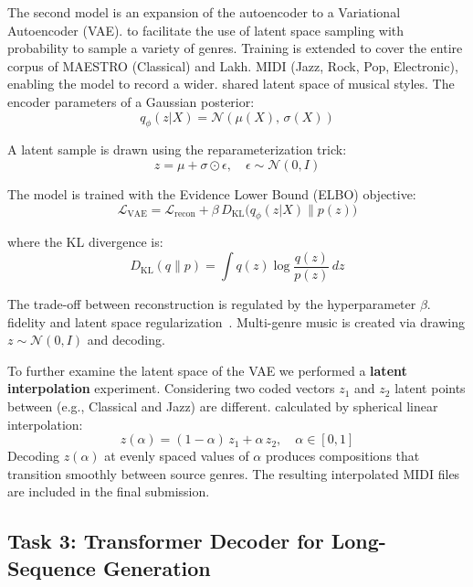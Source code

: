 \documentclass[conference]{IEEEtran}
\begin{document}
The second model is an expansion of the autoencoder to a Variational Autoencoder (VAE).
to facilitate the use of latent space sampling with probability to sample a variety of genres. Training
is extended to cover the entire corpus of MAESTRO (Classical) and Lakh.
MIDI (Jazz, Rock, Pop, Electronic), enabling the model to record a wider.
shared latent space of musical styles. The encoder
parameters of a Gaussian posterior:
\begin{equation}
q_\phi(z|X) = \mathcal{N}(\mu(X),\, \sigma(X))
\end{equation}

A latent sample is drawn using the reparameterization trick:
\begin{equation}
z = \mu + \sigma \odot \epsilon, \quad \epsilon \sim \mathcal{N}(0, I)
\end{equation}

The model is trained with the Evidence Lower Bound (ELBO) objective:
\begin{equation}
\mathcal{L}_{\text{VAE}} = \mathcal{L}_{\text{recon}} + \beta \, D_{\text{KL}}\bigl(q_\phi(z|X) \| p(z)\bigr)
\end{equation}

where the KL divergence is:
\begin{equation}
D_{\text{KL}}(q \| p) = \int q(z) \log \frac{q(z)}{p(z)}\, dz
\end{equation}


The trade-off between reconstruction is regulated by the hyperparameter $\beta$.
fidelity and latent space regularization~\cite{higgins2016beta}. Multi-genre
music is created via drawing $z \sim \mathcal{N}(0, I)$ and decoding.

To further examine the latent space of the VAE we performed a \textbf{latent
interpolation} experiment. Considering two coded vectors $z_1$  and $z_2$ 
latent points between (e.g., Classical and Jazz) are different.
calculated by spherical linear interpolation:
\begin{equation}
z(\alpha) = (1-\alpha)\,z_1 + \alpha\,z_2, \quad \alpha \in [0,1]
\end{equation}
Decoding $z(\alpha)$ at evenly spaced values of $\alpha$ produces compositions
that transition smoothly between source genres. The resulting interpolated MIDI
files are included in the final submission.

\subsection{Task 3: Transformer Decoder for Long-Sequence Generation}
\end{document}
